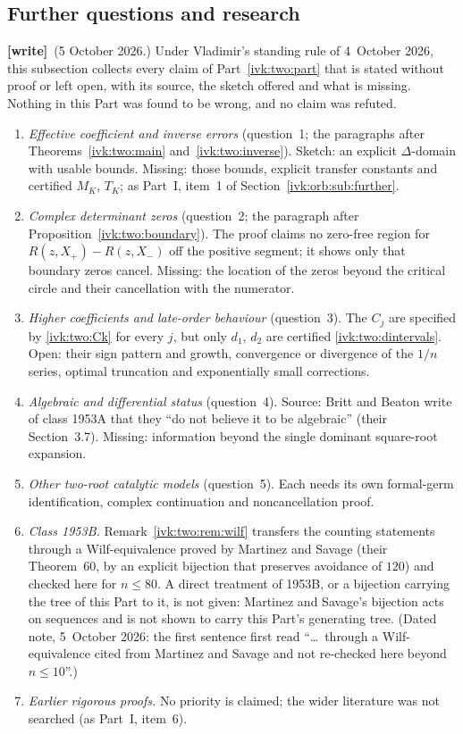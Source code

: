 \documentclass[11pt,letterpaper]{article}
\theoremstyle{remark}\newtheorem{remark}[theorem]{Remark}
\newcommand{\wtag}{\textup{\textbf{[write]}}}
\begin{document}
\subsection{Further questions and research}\label{ivk:two:sub:further}
\wtag\ (5 October 2026.) Under Vladimir's standing rule of 4~October 2026, this subsection collects every claim of Part~\ref{ivk:two:part} that is stated without proof or left open, with its source, the sketch offered and what is missing. Nothing in this Part was found to be wrong, and no claim was refuted.
\begin{enumerate}[label=\arabic*.]
\item \emph{Effective coefficient and inverse errors} (question~1; the paragraphs after Theorems~\ref{ivk:two:main} and~\ref{ivk:two:inverse}). Sketch: an explicit $\Delta$-domain with usable bounds. Missing: those bounds, explicit transfer constants and certified $M_K$, $T_K$; as Part~I, item~1 of Section~\ref{ivk:orb:sub:further}.
\item \emph{Complex determinant zeros} (question~2; the paragraph after Proposition~\ref{ivk:two:boundary}). The proof claims no zero-free region for $R(z,X_+)-R(z,X_-)$ off the positive segment; it shows only that boundary zeros cancel. Missing: the location of the zeros beyond the critical circle and their cancellation with the numerator.
\item \emph{Higher coefficients and late-order behaviour} (question~3). The $C_j$ are specified by \eqref{ivk:two:Ck} for every $j$, but only $d_1$, $d_2$ are certified \eqref{ivk:two:dintervals}. Open: their sign pattern and growth, convergence or divergence of the $1/n$ series, optimal truncation and exponentially small corrections.
\item \emph{Algebraic and differential status} (question~4). Source: Britt and Beaton write of class 1953A that they ``do not believe it to be algebraic'' (their Section~3.7). Missing: information beyond the single dominant square-root expansion.
\item \emph{Other two-root catalytic models} (question~5). Each needs its own formal-germ identification, complex continuation and noncancellation proof.
\item \emph{Class 1953B.} Remark~\ref{ivk:two:rem:wilf} transfers the counting statements through a Wilf-equivalence proved by Martinez and Savage (their Theorem~60, by an explicit bijection that preserves avoidance of $120$) and checked here for $n\le80$. A direct treatment of 1953B, or a bijection carrying the tree of this Part to it, is not given: Martinez and Savage's bijection acts on sequences and is not shown to carry this Part's generating tree. (Dated note, 5~October 2026: the first sentence first read ``\ldots\ through a Wilf-equivalence cited from Martinez and Savage and not re-checked here beyond $n\le10$''.)
\item \emph{Earlier rigorous proofs.} No priority is claimed; the wider literature was not searched (as Part~I, item~6).
\end{enumerate}
\end{document}
